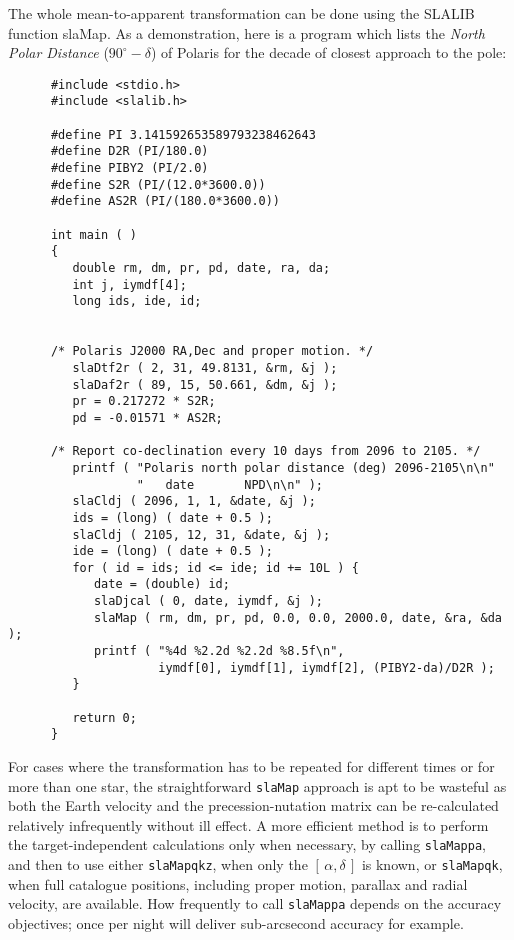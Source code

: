 \documentclass[11pt,fleqn,twoside]{article}
\renewcommand{\_}{{\tt\char'137}}     %
\newcommand{\radec}     {$[\,\alpha,\delta\,]$}
\begin{document}
The whole mean-to-apparent transformation can be done using the SLALIB
function
slaMap.  As a demonstration, here is a program which lists the
{\it North Polar Distance}\/ ($90^\circ-\delta$) of Polaris for
the decade of closest approach to the pole:
\goodbreak
\vspace{-3ex}
\begin{verbatim}
      #include <stdio.h>
      #include <slalib.h>

      #define PI 3.141592653589793238462643
      #define D2R (PI/180.0)
      #define PIBY2 (PI/2.0)
      #define S2R (PI/(12.0*3600.0))
      #define AS2R (PI/(180.0*3600.0))

      int main ( )
      {
         double rm, dm, pr, pd, date, ra, da;
         int j, iymdf[4];
         long ids, ide, id;


      /* Polaris J2000 RA,Dec and proper motion. */
         slaDtf2r ( 2, 31, 49.8131, &rm, &j );
         slaDaf2r ( 89, 15, 50.661, &dm, &j );
         pr = 0.217272 * S2R;
         pd = -0.01571 * AS2R;

      /* Report co-declination every 10 days from 2096 to 2105. */
         printf ( "Polaris north polar distance (deg) 2096-2105\n\n"
                  "   date       NPD\n\n" );
         slaCldj ( 2096, 1, 1, &date, &j );
         ids = (long) ( date + 0.5 );
         slaCldj ( 2105, 12, 31, &date, &j );
         ide = (long) ( date + 0.5 );
         for ( id = ids; id <= ide; id += 10L ) {
            date = (double) id;
            slaDjcal ( 0, date, iymdf, &j );
            slaMap ( rm, dm, pr, pd, 0.0, 0.0, 2000.0, date, &ra, &da );
            printf ( "%4d %2.2d %2.2d %8.5f\n",
                     iymdf[0], iymdf[1], iymdf[2], (PIBY2-da)/D2R );
         }

         return 0;
      }
\end{verbatim}
\vspace{-3ex}
\goodbreak
For cases where the transformation has to be repeated for different
times or for more than one star, the straightforward
{\tt slaMap}
approach is apt to be
wasteful as both the Earth velocity and the
precession-nutation matrix can be re-calculated relatively
infrequently without ill effect.  A more efficient method is to
perform the target-independent calculations only when necessary,
by calling
{\tt slaMappa},
and then to use either
{\tt slaMapqkz},
when only the \radec\/ is known, or
{\tt slaMapqk},
when full catalogue positions, including proper motion, parallax and
radial velocity, are available.  How frequently to call
{\tt slaMappa}
depends on the accuracy objectives;  once per
night will deliver sub-arcsecond accuracy for example.
 
\end{document}
